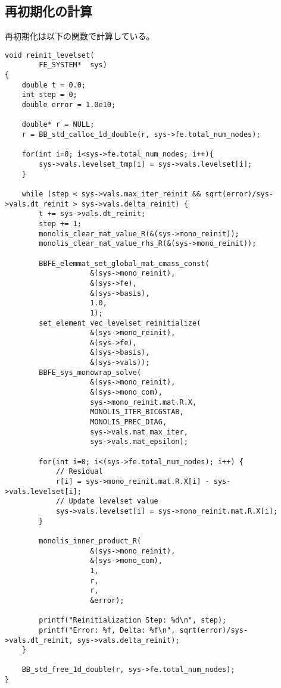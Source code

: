 \subsection{再初期化の計算}
再初期化は以下の関数で計算している。
\begin{lstlisting}[caption = mlflow\_fs\_sups.cにおける再初期化の計算]
void reinit_levelset(
		FE_SYSTEM*  sys)
{
	double t = 0.0;
	int step = 0;
	double error = 1.0e10;

	double* r = NULL;
	r = BB_std_calloc_1d_double(r, sys->fe.total_num_nodes);

	for(int i=0; i<sys->fe.total_num_nodes; i++){
		sys->vals.levelset_tmp[i] = sys->vals.levelset[i];
	}

	while (step < sys->vals.max_iter_reinit && sqrt(error)/sys->vals.dt_reinit > sys->vals.delta_reinit) {
		t += sys->vals.dt_reinit;
		step += 1;
		monolis_clear_mat_value_R(&(sys->mono_reinit));
		monolis_clear_mat_value_rhs_R(&(sys->mono_reinit));

		BBFE_elemmat_set_global_mat_cmass_const(
					&(sys->mono_reinit),
					&(sys->fe),
					&(sys->basis), 
					1.0, 
					1);
		set_element_vec_levelset_reinitialize(
					&(sys->mono_reinit),
					&(sys->fe),
					&(sys->basis),
					&(sys->vals));
		BBFE_sys_monowrap_solve(
					&(sys->mono_reinit),
					&(sys->mono_com),
					sys->mono_reinit.mat.R.X,
					MONOLIS_ITER_BICGSTAB,
					MONOLIS_PREC_DIAG,
					sys->vals.mat_max_iter,
					sys->vals.mat_epsilon);

		for(int i=0; i<(sys->fe.total_num_nodes); i++) {
			// Residual
			r[i] = sys->mono_reinit.mat.R.X[i] - sys->vals.levelset[i];
			// Update levelset value
			sys->vals.levelset[i] = sys->mono_reinit.mat.R.X[i];
		}

		monolis_inner_product_R(
					&(sys->mono_reinit),
					&(sys->mono_com),
					1,
					r,
					r,
					&error);

		printf("Reinitialization Step: %d\n", step);
		printf("Error: %f, Delta: %f\n", sqrt(error)/sys->vals.dt_reinit, sys->vals.delta_reinit);
	}

	BB_std_free_1d_double(r, sys->fe.total_num_nodes);
}
\end{lstlisting}


